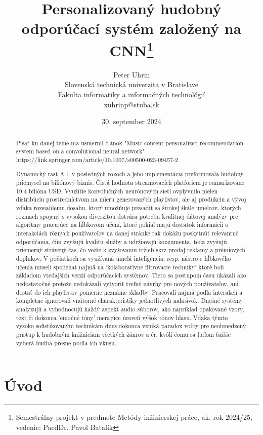 \documentclass[10pt,twoside,slovak,a4paper, colorinlistoftodos]{article}
\title{Personalizovaný hudobný odporúčací systém založený na CNN\thanks{Semestrálny projekt v predmete Metódy inžinierskej práce, ak. rok 2024/25, vedenie: PaedDr. Pavol Baťalík}}
\author{Peter Uhrin\\[2pt]
	{\small Slovenská technická univerzita v Bratislave}\\
	{\small Fakulta informatiky a informačných technológií}\\
	{\small {xuhrinp@stuba.sk}}}
\date{\small 30. september 2024}
\begin{document}
\maketitle

\begin{abstract}

Písať ku danej téme ma usmernil článok "Music content personalized recommendation system based on a convolutional neural network" 
https://link.springer.com/article/10.1007/s00500-023-09457-2

Dynamický rast A.I. v posledných rokoch a jeho implementácia preformovala hudobný priemysel na biliónový biznis. Čistá hodnota streamovacích platforiem je sumarizovane 19,4 bilióna USD. Využitie konvolučných neurónových sietí ovplyvnilo nielen distribúciu prostredníctvom na mieru generovaných playlistov, ale aj produkciu a vývoj vďaka rozsiahlemu dosahu, ktorý umožňuje presadiť sa širokej škále umelcov, ktorých rozmach spojený s vysokou diverzitou dotvára potrebu kvalitnej dátovej analýzy pre algoritmy pracujúce na hĺbkovom učení, ktoré pokiaľ majú dostatok informácií o interakciách rôznych používateľov na danej stránke tak dokážu poskytnúť relevantné odporúčania, čím zvyšujú kvalitu služby a udržiavajú konzumenta, teda zvyšujú priemerný strávený čas, čo vedie k zvyšovaniu tržieb skrz predaj reklamy a prémiových doplnkov. V počiatkoch sa využívaná umelá inteligencia, resp. nástroje hĺbkového učenia museli spoliehať najmä na 'kolaboratívne filtrovacie techniky' ktoré boli základom vtedajších verzií odporúčacích systémov. Tieto sa postupom času ukázali ako nedostatočné pretože nedokázali vytvoriť trefné návrhy pre nových používateľov, ani dostať do ich playlistov pomerne neznáme skladby. Pracovali najmä podľa interakcií a kompletne ignorovali vnútorné charakteristiky jednotlivých nahrávok. Dnešné systémy analyzujú a vyhodnocujú každý aspekt audio súborov, ako napríklad opakované vzory, text či dokonca 'emočné tóny' merajúce úroveň výšok tónov hlasu. Vďaka týmto vysoko sofistikovaným technikám dnes dokonca vzniká paradox voľby pre neobmedzený prístup k hudobným knižniciam všetkých žánrov a ér, kvôli čomu sa ľuďom ťažšie vyberá hudba presne podľa ich vkusu.

\end{abstract}



\section{Úvod}
\end{document}
